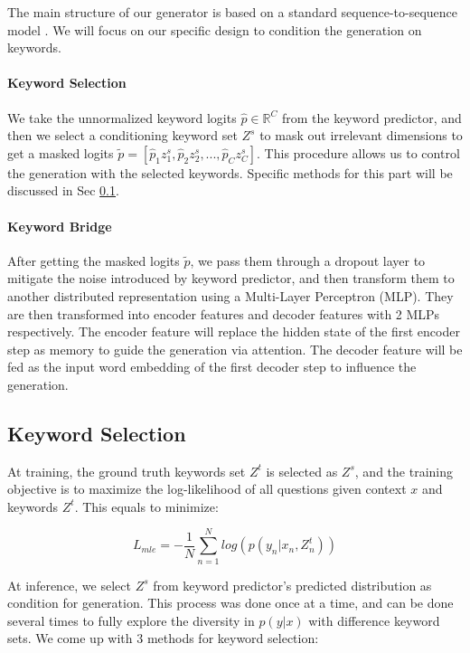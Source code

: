The main structure of our generator is based on a standard sequence-to-sequence model \citep{luong2015effective}. We will focus on our specific design to condition the generation on keywords. 

\paragraph{Keyword Selection} We take the unnormalized keyword logits $\hat{p} \in \mathbb{R}^C$ from the keyword predictor, and then we select a conditioning keyword set $Z^s$ to mask out irrelevant dimensions to get a masked logits $\tilde{p} = [\hat{p}_1 z^s_1, \hat{p}_2 z^s_2, ..., \hat{p}_C z^s_C]$. This procedure allows us to control the generation with the selected keywords. Specific methods for this part will be discussed in Sec \ref{sec:selection}.

\paragraph{Keyword Bridge} After getting the masked logits $\tilde{p}$, we pass them through a dropout layer to mitigate the noise introduced by keyword predictor, and then transform them to another distributed representation using a Multi-Layer Perceptron (MLP). They are then transformed into encoder features and decoder features with 2 MLPs respectively. The encoder feature will replace the hidden state of the first encoder step as memory to guide the generation via attention. The decoder feature will be fed as the input word embedding of the first decoder step to influence the generation.

\subsection{Keyword Selection}
\label{sec:selection}

At training, the ground truth keywords set $Z^t$ is selected as $Z^s$, and the training objective is to maximize the log-likelihood of all questions given context $x$ and keywords $Z^t$. This equals to minimize: 

\begin{equation}
  L_{mle} = -\frac{1}{N}\sum^N_{n=1}log(p(y_n|x_n,Z^t_n))
  \label{equ:mle}
\end{equation}

At inference, we select $Z^s$ from keyword predictor's predicted distribution as condition for generation. This process was done once at a time, and can be done several times to fully explore the diversity in $p(y|x)$ with difference keyword sets. We come up with 3 methods for keyword selection:


